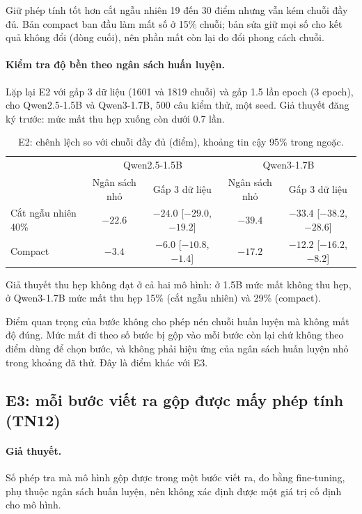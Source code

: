 \documentclass[11pt]{article}
\begin{document}
Giữ phép tính tốt hơn cắt ngẫu nhiên 19 đến 30 điểm nhưng vẫn kém chuỗi đầy đủ. Bản compact ban đầu làm mất
số ở 15\% chuỗi; bản sửa giữ mọi số cho kết quả không đổi (dòng cuối), nên phần mất còn lại do đổi phong
cách chuỗi.

\paragraph{Kiểm tra độ bền theo ngân sách huấn luyện.} Lặp lại E2 với gấp 3 dữ liệu (1601 và 1819 chuỗi) và
gấp 1.5 lần epoch (3 epoch), cho Qwen2.5-1.5B và Qwen3-1.7B, 500 câu kiểm thử, một seed. Giả thuyết đăng ký
trước: mức mất thu hẹp xuống còn dưới 0.7 lần.

\begin{table}[h]
\centering\small
\caption{E2: chênh lệch so với chuỗi đầy đủ (điểm), khoảng tin cậy 95\% trong ngoặc.}
\begin{tabular}{lcccc}
\toprule
 & \multicolumn{2}{c}{Qwen2.5-1.5B} & \multicolumn{2}{c}{Qwen3-1.7B} \\
 & Ngân sách nhỏ & Gấp 3 dữ liệu & Ngân sách nhỏ & Gấp 3 dữ liệu \\
\midrule
Cắt ngẫu nhiên 40\% & $-22.6$ & $-24.0$ [$-29.0$, $-19.2$] & $-39.4$ & $-33.4$ [$-38.2$, $-28.6$] \\
Compact & $-3.4$ & $-6.0$ [$-10.8$, $-1.4$] & $-17.2$ & $-12.2$ [$-16.2$, $-8.2$] \\
\bottomrule
\end{tabular}
\end{table}

Giả thuyết thu hẹp không đạt ở cả hai mô hình: ở 1.5B mức mất không thu hẹp, ở Qwen3-1.7B mức mất thu hẹp
15\% (cắt ngẫu nhiên) và 29\% (compact).

\begin{ketluan}
Điểm quan trọng của bước không cho phép nén chuỗi huấn luyện mà không mất độ đúng. Mức mất đi theo số bước
bị gộp vào mỗi bước còn lại chứ không theo điểm dùng để chọn bước, và không phải hiệu ứng của ngân sách
huấn luyện nhỏ trong khoảng đã thử. Đây là điểm khác với E3.
\end{ketluan}

\subsection{E3: mỗi bước viết ra gộp được mấy phép tính (TN12)}

\paragraph{Giả thuyết.} Số phép tra mà mô hình gộp được trong một bước viết ra, đo bằng fine-tuning, phụ
thuộc ngân sách huấn luyện, nên không xác định được một giá trị cố định cho mô hình.
\end{document}
